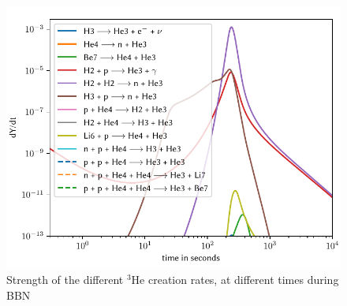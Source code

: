 \begin{figure}[ht]
    \includegraphics[width=5.1in]{figures/app/He3create.pdf}
    \caption{Strength of the different ${}^3$He creation rates, at different times during BBN}
    \label{fig:He3create}
\end{figure}

